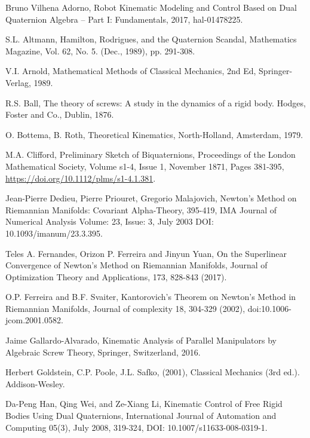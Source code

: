 \documentclass[reqno,12pt]{amsart}
\begin{document}
\begin{thebibliography}{99}

 Bruno Vilhena Adorno, Robot Kinematic Modeling and Control Based on Dual Quaternion Algebra -- Part I: Fundamentals, 2017, hal-01478225.

 S.L. Altmann, Hamilton, Rodrigues, and the Quaternion Scandal, Mathematics Magazine, Vol. 62, No. 5. (Dec., 1989), pp. 291-308.

 V.I. Arnold, Mathematical Methods of Classical Mechanics, 2nd Ed, Springer-Verlag, 1989.

 R.S. Ball, The theory of screws: A study in the dynamics of a rigid body. Hodges, Foster and Co., Dublin, 1876.

 O. Bottema, B. Roth, Theoretical Kinematics, North-Holland, Amsterdam, 1979.

 M.A. Clifford, Preliminary Sketch of Biquaternions, Proceedings of the London Mathematical Society, Volume s1-4, Issue 1, November 1871, Pages 381-395, \url{https://doi.org/10.1112/plms/s1-4.1.381}.

 Jean-Pierre Dedieu, Pierre Priouret, Gregorio Malajovich, Newton’s Method on Riemannian Manifolds: Covariant Alpha-Theory, 395-419, IMA Journal of Numerical Analysis Volume: 23, Issue: 3, July 2003 DOI: 10.1093/imanum/23.3.395.

 Teles A. Fernandes, Orizon P. Ferreira and Jinyun Yuan, On the Superlinear Convergence of Newton’s Method on Riemannian Manifolds, Journal of Optimization Theory and Applications, 173, 828-843 (2017).

 O.P. Ferreira and B.F. Svaiter, Kantorovich's Theorem on Newton's Method in Riemannian Manifolds, Journal of complexity 18, 304-329 (2002), doi:10.1006-jcom.2001.0582.

 Jaime Gallardo-Alvarado, Kinematic Analysis of Parallel Manipulators by Algebraic Screw Theory, Springer, Switzerland, 2016.

 Herbert Goldstein, C.P. Poole, J.L. Safko, (2001), Classical Mechanics (3rd ed.). Addison-Wesley.

 Da-Peng Han, Qing Wei, and Ze-Xiang Li, Kinematic Control of Free Rigid Bodies Using Dual Quaternions, International Journal of Automation and Computing
05(3), July 2008, 319-324, DOI: 10.1007/s11633-008-0319-1.


\end{thebibliography}
\end{document}

